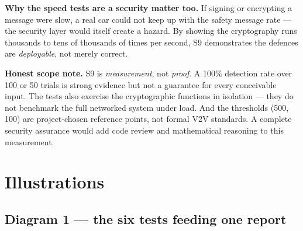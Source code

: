 \documentclass[11pt,a4paper]{article}
\begin{document}
\noindent\textbf{Why the speed tests are a security matter too.} If signing or
encrypting a message were slow, a real car could not keep up with the safety
message rate --- the security layer would itself create a hazard. By showing the
cryptography runs thousands to tens of thousands of times per second, S9
demonstrates the defences are \emph{deployable}, not merely correct.

\textbf{Honest scope note.} S9 is \emph{measurement}, not \emph{proof}. A 100\%
detection rate over 100 or 50 trials is strong evidence but not a guarantee for
every conceivable input. The tests also exercise the cryptographic functions in
isolation --- they do not benchmark the full networked system under load. And the
thresholds (500, 100) are project-chosen reference points, not formal V2V
standards. A complete security assurance would add code review and mathematical
reasoning to this measurement.

\section{Illustrations}

\subsection{Diagram 1 --- the six tests feeding one report}
\begin{center}
\end{center}
\end{document}
